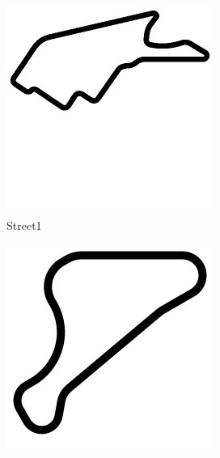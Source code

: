 \begin{figure}
\centering
\begin{subfigure}[b]{0.15\textwidth}
       \includegraphics[width=\textwidth]{img/tracks/Street1}
       \caption{Street1}
   \end{subfigure}
\begin{subfigure}[b]{0.15\textwidth}
       \includegraphics[width=\textwidth]{img/tracks/CG-Speedway}

\end{subfigure}
\end{figure}
